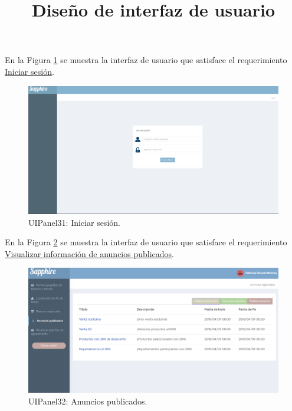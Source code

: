 \title{\textbf{Diseño de interfaz de usuario \\}}

En la Figura \ref{PA:iniciarsesion} se muestra la interfaz de usuario que satisface el requerimiento \hyperlink{RFPA}{Iniciar sesión}.
\FloatBarrier
\begin{figure}[htbp!]
		\centering
			\includegraphics[width=1 \textwidth]{imagenes/UI/prototipo3/iniciarsesion}
		\caption{UIPanel31: Iniciar sesión.}
		\label{PA:iniciarsesion}
\end{figure}
\FloatBarrier

En la Figura \ref{PA:anunciospublicados} se muestra la interfaz de usuario que satisface el requerimiento \hyperlink{RFPA}{Visualizar información de anuncios publicados}.
\FloatBarrier
\begin{figure}[htbp!]
		\centering
			\includegraphics[width=1 \textwidth]{imagenes/UI/prototipo3/anunciosregistrados}
		\caption{UIPanel32: Anuncios publicados.}
		\label{PA:anunciospublicados}
\end{figure}
\FloatBarrier

